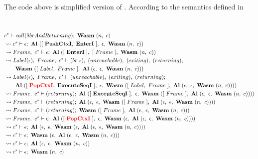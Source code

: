 The code above is simplified version of \spectecp{}.
According to the semantics defined in 


 \\
\begin{align}
  &c^* \vdash call(\$brAndReturning); ~ \textbf{Wasm} ~ (n, ~ c)
  \label{eq:resolve-1} \\
  &\leadsto c^* \vdash \epsilon; ~ \textbf{Al} ~ ([ ~ \textbf{PushCtxI}, ~ \textbf{EnterI} ~ ], ~ \epsilon, ~ \textbf{Wasm} ~ (n, ~ c))
  \label{eq:resolve-2} \\
  &\leadsto Frame, ~ c^* \vdash \epsilon; ~ \textbf{Al} ~ ([ ~ \textbf{EnterI} ~ ], ~ [ ~ Frame ~ ], ~ \textbf{Wasm} ~ (n, ~ c))
  \label{eq:resolve-3} \\
  &\leadsto Label(\epsilon), ~ Frame, ~ c^* \vdash (br ~ \epsilon), ~ (unreachable), ~ (exiting), ~ (returning); \\
  &\quad\quad \textbf{Wasm} ~ ([ ~ Label, ~ Frame ~ ], ~ \textbf{Al} ~ (\epsilon, ~ \epsilon, ~ \textbf{Wasm} ~ (n, ~ c)))
  \label{eq:resolve-4} \\
  &\leadsto Label(\epsilon), ~ Frame, ~ c^* \vdash (unreachable), ~ (exiting), ~ (returning); \\
  &\quad\quad \textbf{Al} ~ ([ ~ \textcolor{red}{\textbf{PopCtxI}}, ~ \textbf{ExecuteSeqI} ~ ], ~ \epsilon, ~ \textbf{Wasm} ~ ([ ~ Label, ~ Frame ~ ], ~ \textbf{Al} ~ (\epsilon, ~ \epsilon, ~ \textbf{Wasm} ~ (n, ~ c))))
  \label{eq:resolve-5} \\
  &\leadsto Frame, ~ c^* \vdash (returning); ~
    \textbf{Al} ~ ([ ~ \textbf{ExecuteSeqI} ~ ], ~ \epsilon, ~ \textbf{Wasm} ~ ([ ~ Frame ~ ], ~ \textbf{Al} ~ (\epsilon, ~ \epsilon, ~ \textbf{Wasm} ~ (n, ~ c))))
  \label{eq:resolve-6} \\
  &\leadsto Frame, ~ c^* \vdash (returning); ~
    \textbf{Al} ~ (\epsilon, ~ \epsilon, ~ \textbf{Wasm} ~ ([ ~ Frame ~ ], ~ \textbf{Al} ~ (\epsilon, ~ \epsilon, ~ \textbf{Wasm} ~ (n, ~ c))))
  \label{eq:resolve-7} \\
  &\leadsto Frame, ~ c^* \vdash (returning); ~ \textbf{Wasm} ~ ([ ~ Frame ~ ], ~ \textbf{Al} ~ (\epsilon, ~ \epsilon, ~ \textbf{Wasm} ~ (n, ~ c)))
  \label{eq:resolve-8} \\
  &\leadsto Frame, ~ c^* \vdash \epsilon; ~
    \textbf{Al} ~ ([ ~ \textcolor{red}{\textbf{PopCtxI}} ~ ], ~ \epsilon, ~ \textbf{Wasm} ~ (\epsilon, ~ \textbf{Al} ~ (\epsilon, ~ \epsilon, ~ \textbf{Wasm} ~ (n, ~ c))))
  \label{eq:resolve-9} \\
  &\leadsto c^* \vdash \epsilon; ~
    \textbf{Al} ~ (\epsilon, ~ \epsilon, ~ \textbf{Wasm} ~ (\epsilon, ~ \textbf{Al} ~ (\epsilon, ~ \epsilon, ~ \textbf{Wasm} ~ (n, ~ c))))
  \label{eq:resolve-10} \\
  &\leadsto c^* \vdash \epsilon; ~ \textbf{Wasm} ~ (\epsilon, ~ \textbf{Al} ~ (\epsilon, ~ \epsilon, ~ \textbf{Wasm} ~ (n, ~ c)))
  \label{eq:resolve-11} \\
  &\leadsto c^* \vdash \epsilon; ~ \textbf{Al} ~ (\epsilon, ~ \epsilon, ~ \textbf{Wasm} ~ (n, ~ c))
  \label{eq:resolve-12} \\
  &\leadsto c^* \vdash \epsilon; ~ \textbf{Wasm} ~ (n, ~ c)
  \label{eq:resolve-13}
\end{align}
